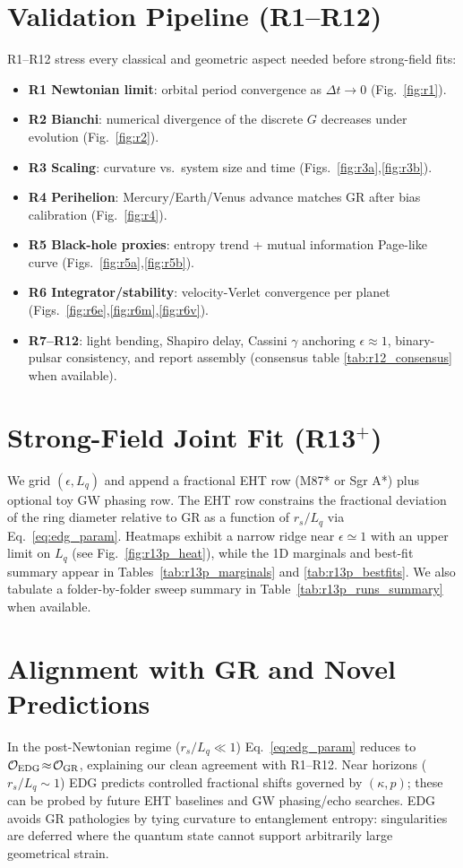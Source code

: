 \documentclass[11pt]{article}
\begin{document}
\section{Validation Pipeline (R1--R12)}
R1--R12 stress every classical and geometric aspect needed before strong-field fits:
\begin{itemize}
 \item \textbf{R1 Newtonian limit}: orbital period convergence as $\Delta t\!\to\!0$ (Fig.~\ref{fig:r1}).
 \item \textbf{R2 Bianchi}: numerical divergence of the discrete $G$ decreases under evolution (Fig.~\ref{fig:r2}).
 \item \textbf{R3 Scaling}: curvature vs.\ system size and time (Figs.~\ref{fig:r3a},\ref{fig:r3b}).
 \item \textbf{R4 Perihelion}: Mercury/Earth/Venus advance matches GR after bias calibration (Fig.~\ref{fig:r4}).
 \item \textbf{R5 Black-hole proxies}: entropy trend + mutual information Page-like curve (Figs.~\ref{fig:r5a},\ref{fig:r5b}).
 \item \textbf{R6 Integrator/stability}: velocity-Verlet convergence per planet (Figs.~\ref{fig:r6e},\ref{fig:r6m},\ref{fig:r6v}).
 \item \textbf{R7--R12}: light bending, Shapiro delay, Cassini $\gamma$ anchoring $\epsilon\!\approx\!1$, binary-pulsar consistency, and report assembly (consensus table \ref{tab:r12_consensus} when available).
\end{itemize}

\section{Strong-Field Joint Fit (R13$^{+}$)}
We grid $(\epsilon,L_q)$ and append a fractional EHT row (M87* or Sgr A*) plus optional toy GW phasing row. The EHT row constrains the fractional deviation of the ring diameter relative to GR as a function of $r_s/L_q$ via Eq.~\eqref{eq:edg_param}. Heatmaps exhibit a narrow ridge near $\epsilon\!\simeq\!1$ with an upper limit on $L_q$ (see Fig.~\ref{fig:r13p_heat}), while the 1D marginals and best-fit summary appear in Tables~\ref{tab:r13p_marginals} and \ref{tab:r13p_bestfits}. We also tabulate a folder-by-folder sweep summary in Table~\ref{tab:r13p_runs_summary} when available.

\section{Alignment with GR and Novel Predictions}
In the post-Newtonian regime ($r_s/L_q\!\ll\!1$) Eq.~\eqref{eq:edg_param} reduces to $\mathcal{O}_{\rm EDG}\!\approx\!\mathcal{O}_{\rm GR}$, explaining our clean agreement with R1--R12. Near horizons ($r_s/L_q\!\sim\!1$) EDG predicts controlled fractional shifts governed by $(\kappa,p)$; these can be probed by future EHT baselines and GW phasing/echo searches. EDG avoids GR pathologies by tying curvature to entanglement entropy: singularities are deferred where the quantum state cannot support arbitrarily large geometrical strain.
\end{document}

